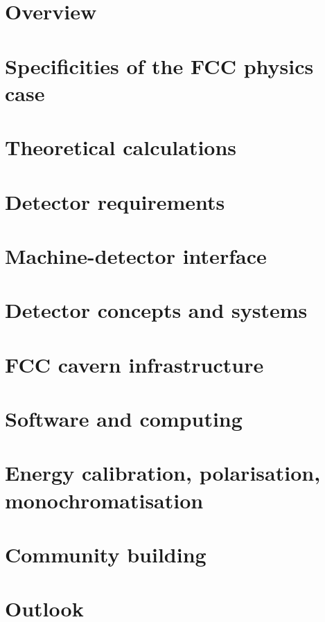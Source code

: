 \documentclass[../PED-Volume.tex]{subfiles}
\begin{document}
\section{Overview}
\label{sec:overview}



\cleardoublepage
\section{Specificities of the FCC physics case}
\label{sec:physics}


\cleardoublepage
\section{Theoretical calculations}
\label{sec:theory}


\cleardoublepage
\section{Detector requirements}
\label{sec:requirements}


\cleardoublepage
\section{Machine-detector interface}
\label{sec:mdi}


\cleardoublepage
\section{Detector concepts and systems}
\label{sec:concepts}


\cleardoublepage
\section{FCC cavern infrastructure}
\label{sec:caverns}


\cleardoublepage
\section{Software and computing}
\label{sec:software}


\cleardoublepage
\section{Energy calibration, polarisation, monochromatisation}
\label{sec:epol}


\cleardoublepage
\section{Community building}
\label{sec:community}



\cleardoublepage

\section{Outlook}
\label{sec:conclusion}


\clearpage
\end{document}
